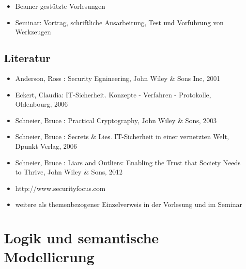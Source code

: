 \begin{itemize}
\tightlist
\item
  Beamer-gestützte Vorlesungen
\item
  Seminar: Vortrag, schriftliche Ausarbeitung, Test und Vorführung von
  Werkzeugen
\end{itemize}

\section*{Literatur\label{/mi-2017/modulbeschreibungen-master/MA_WTW_Modul_IT-Sicherheit}}\label{literaturpathlabelmi-2017modulbeschreibungen-mastermaux5fwtwux5fmodulux5fit-sicherheit}

\begin{itemize}
\tightlist
\item
  Anderson, Ross : Security Egnineering, John Wiley \& Sons Inc, 2001
\item
  Eckert, Claudia: IT-Sicherheit. Konzepte - Verfahren - Protokolle,
  Oldenbourg, 2006
\item
  Schneier, Bruce : Practical Cryptography, John Wiley \& Sons, 2003
\item
  Schneier, Bruce : Secrets \& Lies. IT-Sicherheit in einer vernetzten
  Welt, Dpunkt Verlag, 2006
\item
  Schneier, Bruce : Liars and Outliers: Enabling the Trust that Society
  Needs to Thrive, John Wiley \& Sons, 2012
\item
  http://www.securityfocus.com
\item
  weitere als themenbezogener Einzelverweis in der Vorlesung und im
  Seminar
\end{itemize}

\chapter{Logik und semantische
Modellierung\label{/mi-2017/modulbeschreibungen-master/MA_WTW_Modul_Logik-und-semantische-Modellierung}}\label{logik-und-semantische-modellierungpathlabelmi-2017modulbeschreibungen-mastermaux5fwtwux5fmodulux5flogik-und-semantische-modellierung}

